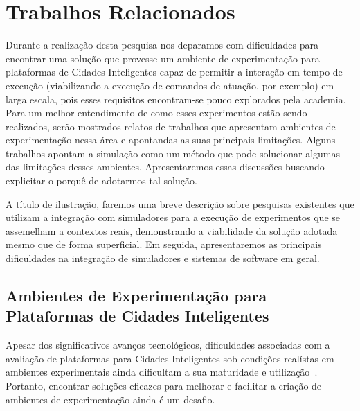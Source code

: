\chapter{Trabalhos Relacionados}
\label{cap:trab-relacionados}

Durante a realização desta pesquisa nos deparamos com dificuldades para encontrar uma solução que provesse um ambiente de experimentação para plataformas de Cidades Inteligentes capaz de permitir a
interação em tempo de execução (viabilizando a execução de comandos de atuação, por exemplo) em larga escala, pois esses requisitos encontram-se pouco explorados pela academia.
Para um melhor entendimento de como esses experimentos estão sendo realizados, serão mostrados relatos de trabalhos que apresentam ambientes de experimentação nessa área e apontandas as suas
principais limitações.
Alguns trabalhos apontam a simulação como um método que pode solucionar algumas das limitações desses ambientes.
Apresentaremos essas discussões buscando explicitar o porquê de adotarmos tal solução.

A título de ilustração, faremos uma breve descrição sobre pesquisas existentes que utilizam a integração com simuladores para a execução de experimentos que se assemelham a contextos reais, demonstrando
a viabilidade da solução adotada mesmo que de forma superficial.
Em seguida, apresentaremos as principais dificuldades na integração de simuladores e sistemas de software em geral.


\section{Ambientes de Experimentação para Plataformas de Cidades Inteligentes}


Apesar dos significativos avanços tecnológicos, dificuldades associadas com a avaliação de plataformas para Cidades Inteligentes sob condições realístas em ambientes experimentais ainda dificultam
a sua maturidade e utilização~\citep{sanchez_2014}.
Portanto, encontrar soluções eficazes para melhorar e facilitar a criação de ambientes de experimentação ainda é um desafio.


